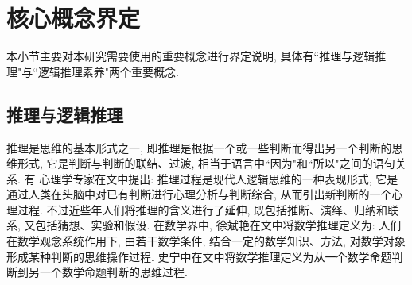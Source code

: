 \documentclass[acaddeg]{Style/SCNUThesisV3}
\begin{document}








\section{核心概念界定}
本小节主要对本研究需要使用的重要概念进行界定说明, 具体有``推理与逻辑推理"与``逻辑推理素养"两个重要概念.

\subsection{推理与逻辑推理}

推理是思维的基本形式之一, 即推理是根据一个或一些判断而得出另一个判断的思维形式, 它是判断与判断的联结、过渡, 相当于语言中``因为"和``所以"之间的语句关系. 有 心理学专家在文\cite{朱智贤1989心理学大辞典}中提出: 推理过程是现代人逻辑思维的一种表现形式, 它是通过人类在头脑中对已有判断进行心理分析与判断综合, 从而引出新判断的一个心理过程. 不过近些年人们将推理的含义进行了延伸, 既包括推断、演绎、归纳和联系, 又包括猜想、实验和假设. 在数学界中, 徐斌艳在文\cite{徐斌艳2001数学推理活动在数学教育中的意义}中将数学推理定义为: 人们在数学观念系统作用下, 由若干数学条件, 结合一定的数学知识、方法, 对数学对象形成某种判断的思维操作过程. 史宁中在文\cite{史宁中数学基本思想}中将数学推理定义为从一个数学命题判断到另一个数学命题判断的思维过程. 

  
\end{document}
